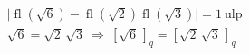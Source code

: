 \documentclass{article}
\begin{document}
\[
\begin{aligned}
&\bigl|\operatorname{fl}(\sqrt6)-\operatorname{fl}(\sqrt2)\operatorname{fl}(\sqrt3)\bigr|=1\ \text{ulp}\\
&\sqrt6=\sqrt2\,\sqrt3\ \Longrightarrow\ [\sqrt6\,]_q=[\sqrt2\,\sqrt3\,]_q
\end{aligned}
\]
\end{document}
